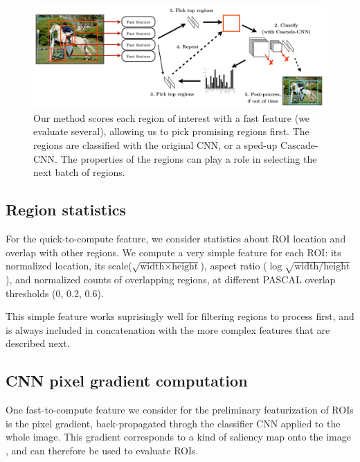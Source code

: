 \begin{figure}[h!]
\begin{center}
\includegraphics[width=0.98\columnwidth]{figures/combined.pdf}
\caption{
Our method scores each region of interest with a fast feature (we evaluate several), allowing us to pick promising regions first.
The regions are classified with the original CNN, or a sped-up Cascade-CNN.
The properties of the regions can play a role in selecting the next batch of regions.
}\label{fig:combined}
\end{center}
\end{figure}

\subsection{Region statistics}\label{sec:region}
For the quick-to-compute feature, we consider statistics about ROI location and overlap with other regions.
We compute a very simple feature for each ROI: its normalized location,
its scale($\sqrt{\text{width} \times \text{height}}$),
aspect ratio ($\log \sqrt{\text{width} / \text{height}}$),
and normalized counts of overlapping regions, at different PASCAL overlap thresholds (0, 0.2, 0.6).

This simple feature works suprisingly well for filtering regions to process first, and is always included in concatenation with the more complex features that are described next.

\subsection{CNN pixel gradient computation}\label{sec:gradient}

One fast-to-compute feature we consider for the preliminary featurization of ROIs is the pixel gradient, back-propagated throgh the classifier CNN applied to the whole image.
This gradient corresponds to a kind of saliency map onto the image \cite{Simonyan-ICLR-2014}, and can therefore be used to evaluate ROIs.

